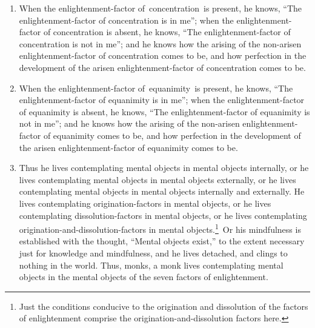 \documentclass[a4 paper, 12pt]{article}
\begin{document}
\begin{multicols}{2}
\begin{enumerate}[resume]
\item When the enlightenment-factor of concentration is present, he knows, “The enlightenment-factor of concentration is in me”; when the enlightenment-factor of concentration is absent, he knows, “The enlightenment-factor of concentration is not in me”; and he knows how the arising of the non-arisen enlightenment-factor of concentration comes to be, and how perfection in the development of the arisen enlightenment-factor of concentration comes to be.
\item When the enlightenment-factor of equanimity is present, he knows, “The enlightenment-factor of equanimity is in me”; when the enlightenment-factor of equanimity is absent, he knows, “The enlightenment-factor of equanimity is not in me”; and he knows how the arising of the non-arisen enlightenment-factor of equanimity comes to be, and how perfection in the development of the arisen enlightenment-factor of equanimity comes to be.
\item Thus he lives contemplating mental objects in mental objects internally, or he lives contemplating mental objects in mental objects externally, or he lives contemplating mental objects in mental objects internally and externally. He lives contemplating origination-factors in mental objects, or he lives contemplating dissolution-factors in mental objects, or he lives contemplating origination-and-dissolution-factors in mental objects.\footnote{Just the conditions conducive to the origination and dissolution of the factors of enlightenment comprise the origination-and-dissolution factors here.} Or his mindfulness is established with the thought, “Mental objects exist,” to the extent necessary just for knowledge and mindfulness, and he lives detached, and clings to nothing in the world. Thus, monks, a monk lives contemplating mental objects in the mental objects of the seven factors of enlightenment.
\end{enumerate}

\end{multicols}
\end{document}
